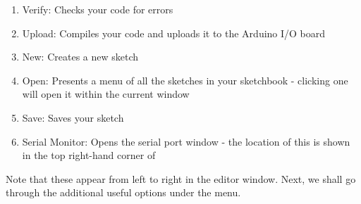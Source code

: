 \begin{enumerate}
      \item Verify: Checks your code for errors
      \item Upload: Compiles your code and uploads it to the Arduino I/O
            board
      \item New: Creates a new sketch
      \item Open: Presents a menu of all the sketches in your
            sketchbook - clicking one will open it within the current window
      \item Save: Saves your sketch
      \item Serial Monitor: Opens the serial port window - the location of
            this is shown in the top right-hand corner of 
\end{enumerate}
Note that these appear from left to right in the editor window. Next, we shall go through the additional useful options under the menu.
